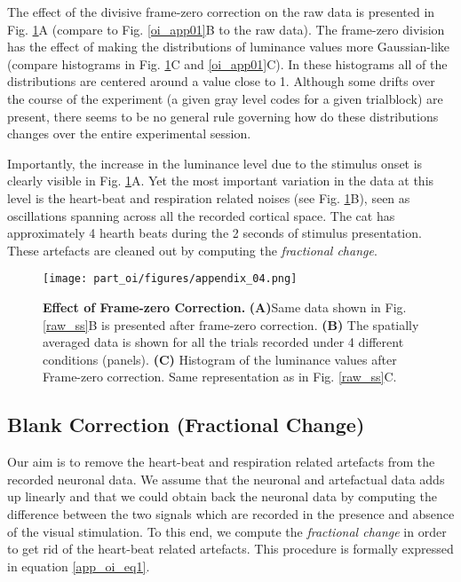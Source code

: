 The effect of the divisive frame-zero correction on the raw data is
presented in Fig. \ref{f0}A (compare to Fig. \ref{oi_app01}B to the raw
data). The frame-zero division has the effect of making the distributions
of luminance values more Gaussian-like (compare histograms in Fig.
\ref{f0}C and \ref{oi_app01}C). In these histograms all of the
distributions are centered around a value close to 1. Although some drifts
over the course of the experiment (a given gray level codes for a given
trialblock) are present, there seems to be no general rule governing how do
these distributions changes over the entire experimental session. 


Importantly, the increase in the luminance level due to the stimulus onset
is clearly visible in Fig. \ref{f0}A. Yet the most important variation in
the data at this level is the heart-beat and respiration related noises
(see Fig. \ref{f0}B), seen as oscillations spanning across all the recorded
cortical space. The cat has approximately 4 hearth beats during the 2
seconds of stimulus presentation. These artefacts are cleaned out by
computing the \textit{fractional change}.

\begin{figure}[!h]
\texttt{[image: part\_oi/figures/appendix\_04.png]}
\caption[Effect of Frame-zero Correction.]{\textbf{Effect of Frame-zero
Correction.} \textbf{(A)}Same data shown in Fig. \ref{raw_ss}B is presented
after frame-zero correction. \textbf{(B)} The spatially averaged data is
shown for all the trials recorded under 4 different conditions (panels).
\textbf{(C)} Histogram of the luminance values after Frame-zero correction.
Same representation as in Fig. \ref{raw_ss}C.} 

\label{f0} 

\end{figure}

\subsection{Blank Correction (Fractional Change)}

Our aim is to remove the heart-beat and respiration related artefacts from
the recorded neuronal data. We assume that the neuronal and artefactual
data adds up linearly and that we could obtain back the neuronal data by
computing the difference between the two signals which are recorded in the
presence and absence of the visual stimulation. To this end, we compute the
\textit{fractional change} in order to get rid of the heart-beat related
artefacts. This procedure is formally expressed in equation
\ref{app_oi_eq1}.

